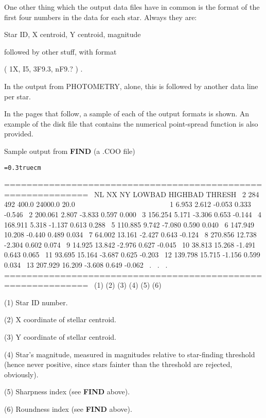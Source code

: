 One other thing which the output data files have in common is the
format of the first four numbers in the data for each star.  Always
they are: 

\centerline{Star ID, X centroid, Y centroid, magnitude} 

\noindent followed by other stuff, with format 

\centerline{( 1X, I5, 3F9.3, nF9.? ) .} 

\noindent In the output from PHOTOMETRY, alone, this is followed by
another data line per star. 

In the pages that follow, a sample of each of the output formats is
shown.  An example of the disk file that contains the numerical
point-spread function is also provided. 
\vfill
\eject
\centerline{Sample output from {\bf FIND} (a .COO file)}
\bigskip
{\noindent\obeylines\obeyspaces\frenchspacing\tt\baselineskip=0.3truecm

=============================================================
\ NL  NX  NY  LOWBAD HIGHBAD  THRESH
\  2 284 492   400.0 24000.0    20.0
~~~~~~~~~~~~~~~~~~~~~~~~
\  1    6.953    2.612   -0.053    0.333   -0.546
\  2  200.061    2.807   -3.833    0.597    0.000
\  3  156.254    5.171   -3.306    0.653   -0.144
\  4  168.911    5.318   -1.137    0.613    0.288
\  5  110.885    9.742   -7.080    0.590    0.040
\  6  147.949   10.208   -0.440    0.489    0.034
\  7   64.002   13.161   -2.427    0.643   -0.124
\  8  270.856   12.738   -2.304    0.602    0.074
\  9   14.925   13.842   -2.976    0.627   -0.045
\ 10   38.813   15.268   -1.491    0.643    0.065
\ 11   93.695   15.164   -3.687    0.625   -0.203
\ 12  139.798   15.715   -1.156    0.599    0.034
\ 13  207.929   16.209   -3.608    0.649   -0.062
\                           .
\                           .
\                           .
=============================================================
\ (1)    (2)      (3)      (4)      (5)      (6)
}
\item{(1)} Star ID number.
\item{(2)} X coordinate of stellar centroid.
\item{(3)} Y coordinate of stellar centroid.
\item{(4)} Star's magnitude, measured in magnitudes relative to star-finding
threshold (hence never positive, since stars fainter than the 
threshold are rejected, obviously).
\item{(5)} Sharpness index (see {\bf FIND} above).
\item{(6)} Roundness index (see {\bf FIND} above).
